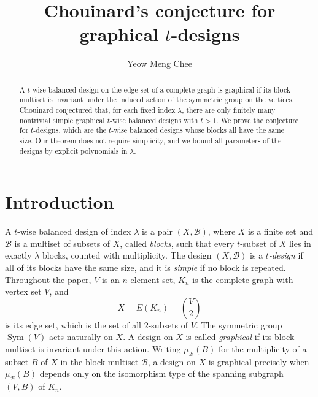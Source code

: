 \documentclass[12pt]{amsart}
\theoremstyle{definition}
\DeclareMathOperator{\Sym}{Sym}
\newcommand{\cB}{\mathcal{B}}
\begin{document}
\title{Chouinard's conjecture for graphical $t$-designs}

\author{Yeow Meng Chee} \address{Singapore University of Technology and
Design, Singapore} 

 

\begin{abstract}
A $t$-wise balanced design on the edge set of a complete graph is graphical
if its block multiset is invariant under the induced action of the symmetric
group on the vertices. Chouinard conjectured that, for each fixed index
$\lambda$, there are only finitely many nontrivial simple graphical $t$-wise
balanced designs with $t > 1$. We prove the conjecture for $t$-designs,
which are the $t$-wise balanced designs whose blocks all have the same size.
Our theorem does not require simplicity, and we bound all parameters of the
designs by explicit polynomials in $\lambda$.
\end{abstract}

\maketitle

\section{Introduction}

A $t$-wise balanced design of index $\lambda$ is a pair $(X, \cB)$, where
$X$ is a finite set and $\cB$ is a multiset of subsets of $X$, called
\emph{blocks}, such that every $t$-subset of $X$ lies in exactly $\lambda$
blocks, counted with multiplicity. The design $(X, \cB)$ is a
\emph{$t$-design} if all of its blocks have the same size, and it is
\emph{simple} if no block is repeated. Throughout the paper, $V$ is an
$n$-element set, $K_n$ is the complete graph with vertex set $V$, and
\[
X = E(K_n) = \binom{V}{2}
\]
is its edge set, which is the set of all $2$-subsets of $V$. The symmetric
group $\Sym(V)$ acts naturally on $X$. A design on $X$ is called
\emph{graphical} if its block multiset is invariant under this action.
Writing $\mu_{\cB}(B)$ for the multiplicity of a subset $B$ of $X$ in the
block multiset $\cB$, a design on $X$ is graphical precisely when
$\mu_{\cB}(B)$ depends only on the isomorphism type of the spanning subgraph
$(V, B)$ of $K_n$.
\end{document}
